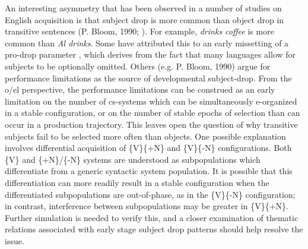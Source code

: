   An interesting asymmetry that has been observed in a number of studies on English acquisition is that subject drop is more common than object drop in transitive sentences (P. Bloom, 1990; \citealt{Valian1991}). For example, \textit{drinks coffee} is more common than \textit{Al drinks}. Some have attributed this to an early missetting of a pro-drop parameter \citep{Hyams2012}, which derives from the fact that many languages allow for subjects to be optionally omitted. Others (e.g. P. Bloom, 1990) argue for performance limitations as the source of developmental subject-drop. From the o/el perspective, the performance limitations can be construed as an early limitation on the number of cs-systems which can be simultaneously e-organized in a stable configuration, or on the number of stable epochs of selection than can occur in a production trajectory. This leaves open the question of why transitive subjects fail to be selected more often than objects. One possible explanation involves differential acquisition of \{V\}\{+N\} and \{V\}\{-N\} configurations. Both \{V\} and \{+N\}/\{-N\} systems are understood as subpopulations which differentiate from a generic syntactic system population. It is possible that this differentiation can more readily result in a stable configuration when the differentiated subpopulations are out-of-phase, as in the \{V\}\{-N\} configuration; in contrast, interference between subpopulations may be greater in \{V\}\{+N\}. Further simulation is needed to verify this, and a closer examination of thematic relations associated with early stage subject drop patterns should help resolve the issue.

